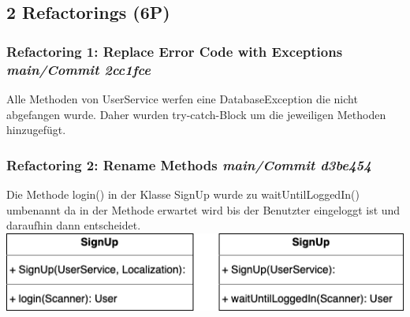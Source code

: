 \subsection{2 Refactorings (6P)}

\subsubsection*{Refactoring 1: Replace Error Code with Exceptions \textit{main/Commit 2cc1fce}} 
Alle Methoden von UserService werfen eine DatabaseException die nicht abgefangen wurde. Daher wurden try-catch-Block um die jeweiligen Methoden hinzugefügt. 
\subsubsection*{Refactoring 2: Rename Methods \textit{main/Commit d3be454}}
Die Methode login() in der Klasse SignUp wurde zu waitUntilLoggedIn() umbenannt da in der Methode erwartet wird bis der Benutzter eingeloggt ist und daraufhin dann entscheidet.
\newline\newline
\includegraphics[width=\linewidth]{kapitel7_refactoring/Refactor2.png}
 